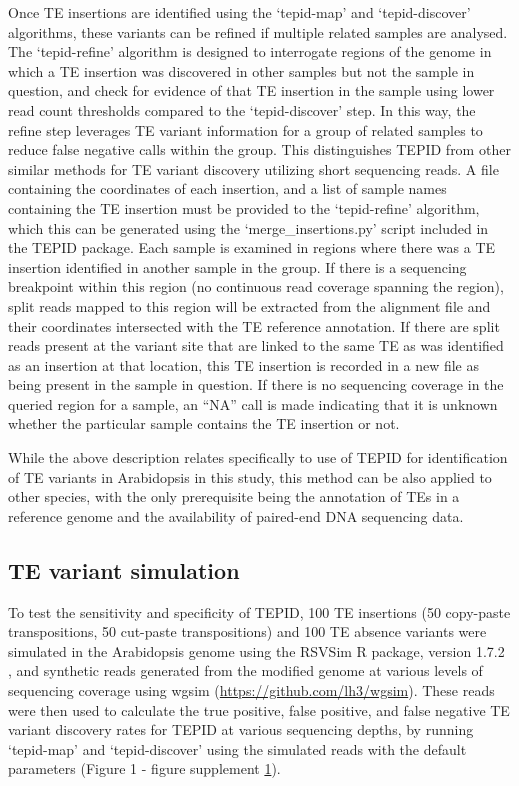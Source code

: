 \documentclass[12pt]{article}
\begin{document}
Once TE insertions are identified using the `tepid-map' and
`tepid-discover' algorithms, these variants can be refined if multiple
related samples are analysed. The `tepid-refine' algorithm is designed
to interrogate regions of the genome in which a TE insertion was
discovered in other samples but not the sample in question, and check
for evidence of that TE insertion in the sample using lower read count
thresholds compared to the `tepid-discover' step. In this way, the
refine step leverages TE variant information for a group of related
samples to reduce false negative calls within the group. This
distinguishes TEPID from other similar methods for TE variant discovery
utilizing short sequencing reads. A file containing the coordinates of
each insertion, and a list of sample names containing the TE insertion
must be provided to the `tepid-refine' algorithm, which this can be
generated using the `merge\_insertions.py' script included in the TEPID
package. Each sample is examined in regions where there was a TE
insertion identified in another sample in the group. If there is a
sequencing breakpoint within this region (no continuous read coverage
spanning the region), split reads mapped to this region will be
extracted from the alignment file and their coordinates intersected with
the TE reference annotation. If there are split reads present at the
variant site that are linked to the same TE as was identified as an
insertion at that location, this TE insertion is recorded in a new file
as being present in the sample in question. If there is no sequencing
coverage in the queried region for a sample, an ``NA'' call is made
indicating that it is unknown whether the particular sample contains the
TE insertion or not.

While the above description relates specifically to use of TEPID for
identification of TE variants in Arabidopsis in this study, this method
can be also applied to other species, with the only prerequisite being
the annotation of TEs in a reference genome and the availability of
paired-end DNA sequencing data.

\subsection{TE variant simulation}

To test the sensitivity and specificity of TEPID, 100 TE insertions (50
copy-paste transpositions, 50 cut-paste transpositions) and 100 TE
absence variants were simulated in the Arabidopsis genome using the
RSVSim R package, version 1.7.2 \cite{Bartenhagen:2013kl}, and synthetic
reads generated from the modified genome at various levels of sequencing
coverage using wgsim \cite{Li:2009ka} (\url{https://github.com/lh3/wgsim}).
These reads were then used to calculate the true positive, false
positive, and false negative TE variant discovery rates for TEPID at
various sequencing depths, by running `tepid-map' and `tepid-discover'
using the simulated reads with the default parameters (Figure 1 - figure
supplement \hyperref[fig1s1]{1}).
\end{document}
